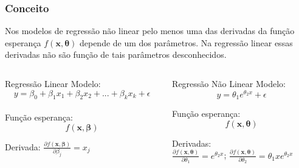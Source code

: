 \documentclass[xcolor=dvipsnames]{beamer}
\begin{document}
        \begin{frame}
  \frametitle{Conceito}

  Nos modelos de regressão não linear pelo menos uma das derivadas da função esperança $f(\textbf{x},\bm{\theta})$ depende de um dos parâmetros. Na regressão linear essas derivadas não são função de tais parâmetros desconhecidos.
  
  \begin{columns}[T] %
    \begin{column}{0.475\textwidth} %
      \begin{block}{Regressão Linear}
      Modelo:
      $$y = \beta_{0}+\beta_{1}x_{1}+\beta_{2}x_{2}+...+\beta_{k}x_{k}+\epsilon$$\\

      Função esperança:\\
      $$f(\textbf{x},\bm{\beta})$$
          
      Derivada: $\frac{\partial f(\textbf{x},\bm{\beta})}{\partial \beta_{j}} = x_{j}$
       
        
      \end{block}
    \end{column}
    
    \begin{column}{0.475\textwidth} %
      \begin{block}{Regressão Não Linear}
        Modelo:
        $$y = \theta_{1}e^{\theta_{2}x}+\epsilon$$
        
        Função esperança:\\
        $$f(\textbf{x},\bm{\theta})$$

        Derivadas: \\
         $\frac{\partial f(\textbf{x},\bm{\theta})}{\partial \theta_{1}} = e^{\theta_{2}x}$;
         $\frac{\partial f(\textbf{x},\bm{\theta})}{\partial \theta_{2}} = \theta_{1}xe^{\theta_{2}x}$   
        
      \end{block}
    \end{column}
  \end{columns}
  
\end{frame}
\end{document}
